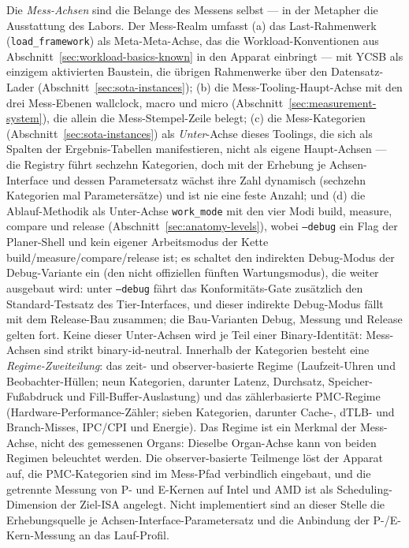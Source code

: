 \begin{nurlang}
Die \emph{Mess-Achsen} sind die Belange des Messens selbst --- in der Metapher die Ausstattung des
Labors. Der Mess-Realm umfasst (a) das Last-Rahmenwerk (\texttt{load\_framework}) als Meta-Meta-Achse,
das die Workload-Konventionen aus Abschnitt~\ref{sec:workload-basics-known} in den Apparat einbringt --- mit
YCSB als einzigem aktivierten Baustein, die übrigen Rahmenwerke über den Datensatz-Lader
(Abschnitt~\ref{sec:sota-instances}); (b) die Mess-Tooling-Haupt-Achse mit den drei Mess-Ebenen
wallclock, macro und micro (Abschnitt~\ref{sec:measurement-system}), die allein die Mess-Stempel-Zeile
belegt; (c) die Mess-Kategorien (Abschnitt~\ref{sec:sota-instances}) als \emph{Unter}-Achse dieses
Toolings, die sich als Spalten der Ergebnis-Tabellen manifestieren, nicht als eigene Haupt-Achsen ---
die Registry führt sechzehn Kategorien, doch mit der Erhebung je Achsen-Interface und dessen
Parametersatz wächst ihre Zahl dynamisch (sechzehn Kategorien mal Parametersätze) und ist nie eine
feste Anzahl; und (d) die Ablauf-Methodik als Unter-Achse \texttt{work\_mode} mit den vier Modi
build, measure, compare und release (Abschnitt~\ref{sec:anatomy-levels}), wobei \texttt{--debug} ein Flag der Planer-Shell und kein eigener Arbeitsmodus der Kette
build/measure/compare/release ist; es schaltet den indirekten Debug-Modus der Debug-Variante ein (den nicht offiziellen fünften Wartungsmodus), die weiter ausgebaut wird: unter \texttt{--debug} fährt das Konformitäts-Gate zusätzlich den
Standard-Testsatz des Tier-Interfaces, und dieser indirekte Debug-Modus fällt mit dem Release-Bau zusammen; die
Bau-Varianten Debug, Messung und Release gelten fort. Keine dieser
Unter-Achsen wird je Teil einer Binary-Identität:
Mess-Achsen sind strikt binary-id-neutral. Innerhalb der Kategorien besteht eine
\emph{Regime-Zweiteilung}: das zeit- und observer-basierte Regime (Laufzeit-Uhren und Beobachter-Hüllen;
neun Kategorien, darunter Latenz, Durchsatz, Speicher-Fußabdruck und Fill-Buffer-Auslastung) und das
zählerbasierte PMC-Regime (Hardware-Performance-Zähler; sieben Kategorien, darunter Cache-, dTLB- und
Branch-Misses, IPC/CPI und Energie). Das Regime ist ein Merkmal der Mess-Achse, nicht des gemessenen
Organs: Dieselbe Organ-Achse kann von beiden Regimen beleuchtet werden. Die observer-basierte
Teilmenge löst der Apparat auf, die PMC-Kategorien sind im Mess-Pfad verbindlich eingebaut, und die
getrennte Messung von P- und E-Kernen auf Intel und AMD ist als Scheduling-Dimension der Ziel-ISA
angelegt. Nicht implementiert sind an dieser Stelle die Erhebungsquelle je
Achsen-Interface-Parametersatz und die Anbindung der P-/E-Kern-Messung an das Lauf-Profil.
\end{nurlang}
